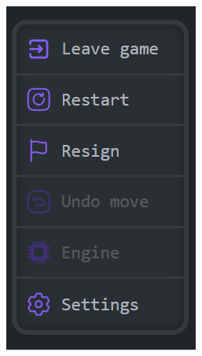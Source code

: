 \documentclass[12pt,a4paper]{article}
\begin{document}
\begin{minipage}[t]{0.2\textwidth} 
    \vspace{0pt} 
    \centering 
    \includegraphics[width=\linewidth]{zdj/ins_min_eopt.png} 
\end{minipage}

\vspace{1cm}
\end{document}
